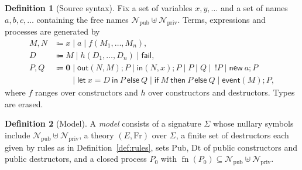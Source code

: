 \documentclass[11pt]{article}
\theoremstyle{definition}
\newtheorem{definition}{Definition}[section]
\theoremstyle{plain}
\theoremstyle{remark}
\newcommand{\Fr}{\mathrm{Fr}}
\newcommand{\Pub}{\mathrm{Pub}}
\newcommand{\Dt}{\mathrm{Dt}}
\newcommand{\pv}[1]{\mathsf{#1}}
\newcommand{\fail}{\pv{fail}}
\newcommand{\Npub}{\mathcal{N}_{\mathrm{pub}}}
\newcommand{\Npriv}{\mathcal{N}_{\mathrm{priv}}}
\newcommand{\fn}{\operatorname{fn}}
\begin{document}
\begin{definition}[Source syntax]\label{def:syntax}
Fix a set of variables $x,y,\dots$ and a set of names $a,b,c,\dots$ containing the free names $\Npub\uplus\Npriv$. Terms, expressions and processes are generated by
\begin{align*}
M,N &\Coloneqq x\mid a\mid f(M_1,\dots,M_n),\\
D &\Coloneqq M\mid h(D_1,\dots,D_n)\mid\fail,\\
P,Q &\Coloneqq \mathbf{0}\mid \pv{out}(N,M);P\mid \pv{in}(N,x);P\mid P\mid Q\mid\,!P\mid\pv{new}\ a;P\\
&\qquad\mid \pv{let}\ x=D\ \pv{in}\ P\ \pv{else}\ Q\mid \pv{if}\ M\ \pv{then}\ P\ \pv{else}\ Q\mid \pv{event}(M);P,
\end{align*}
where $f$ ranges over constructors and $h$ over constructors and destructors. Types are erased.
\end{definition}

\begin{definition}[Model]\label{def:model}
A \emph{model} consists of a signature $\Sigma$ whose nullary symbols include $\Npub\uplus\Npriv$, a theory $(E,\Fr)$ over $\Sigma$, a finite set of destructors each given by rules as in Definition~\ref{def:rules}, sets $\Pub$, $\Dt$ of public constructors and public destructors, and a closed process $P_0$ with $\fn(P_0)\subseteq\Npub\uplus\Npriv$.
\end{definition}
\end{document}
